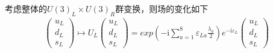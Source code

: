 \documentclass[aps,tightenlines,16pt]{ctexart}
\numberwithin{equation}{section}
\begin{document}
考虑整体的$U(3)_L \times U(3)_R$群变换，则场的变化如下
\begin{align*}
   \begin{pmatrix}
      u_L\\
      d_L\\
      s_L
   \end{pmatrix}
   \mapsto U_L
   \begin{pmatrix}
      u_L\\
      d_L\\
      s_L
   \end{pmatrix}
   =
   exp\left(-\mbox{i}\sum_{a=1}^{8}\varepsilon_{La}\frac{\lambda_a}{2}\right)
   e^{-\mbox{i}\varepsilon_L}
   \begin{pmatrix}
      u_L\\
      d_L\\
      s_L
   \end{pmatrix}
\end{align*}
\end{document}
